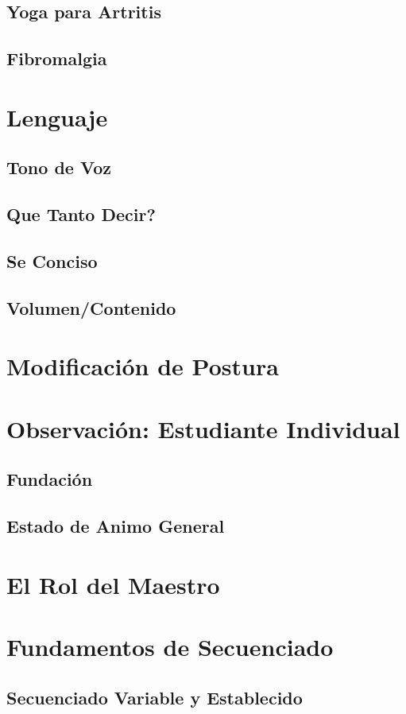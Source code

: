 \documentclass[11pt]{book}
\begin{document}
\subsection{Yoga para Artritis}
\subsection{Fibromalgia}
\section{Lenguaje}
\subsection{Tono de Voz}
\subsection{Que Tanto Decir?}
\subsection{Se Conciso}
\subsection{Volumen/Contenido}
\section{Modificación de Postura}
\section{Observación: Estudiante Individual}
\subsection{Fundación}
\subsection{Estado de Animo General}
\section{El Rol del Maestro}
\section{Fundamentos de Secuenciado}
\subsection{Secuenciado Variable y Establecido}
\end{document}
